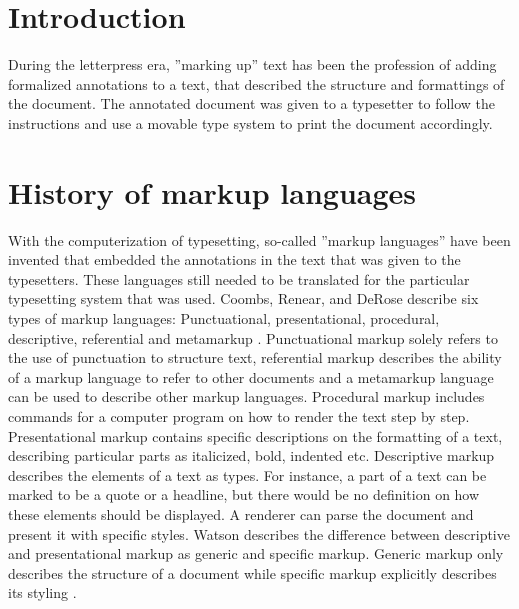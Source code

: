 \section{Introduction}

During the letterpress era, ''marking up'' text has been the profession of adding formalized annotations to a text, that described the structure and formattings of the document. The annotated document was given to a typesetter to follow the instructions and use a movable type system to print the document accordingly.

\section{History of markup languages}

With the computerization of typesetting, so-called ''markup languages'' have been invented that embedded the annotations in the text that was given to the typesetters. These languages still needed to be translated for the particular typesetting system that was used. Coombs, Renear, and DeRose describe six types of markup languages: Punctuational, presentational, procedural, descriptive, referential and metamarkup \cite{Coombs:1987:MSF:32206.32209}. Punctuational markup solely refers to the use of punctuation to structure text, referential markup describes the ability of a markup language to refer to other documents and a metamarkup language can be used to describe other markup languages. Procedural markup includes commands for a computer program on how to render the text step by step. Presentational markup contains specific descriptions on the formatting of a text, describing particular parts as italicized, bold, indented etc. Descriptive markup describes the elements of a text as types. For instance, a part of a text can be marked to be a quote or a headline, but there would be no definition on how these elements should be displayed. A renderer can parse the document and present it with specific styles. Watson describes the difference between descriptive and presentational markup as generic and specific markup. Generic markup only describes the structure of a document while specific markup explicitly describes its styling \cite{watsonhistory}. 



